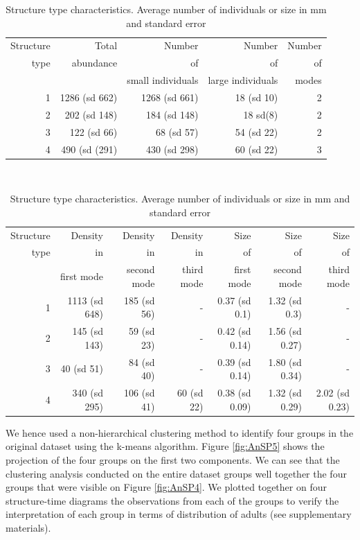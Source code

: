 \begin{table}[!ht]
\centering
\footnotesize
\caption{Structure type characteristics. Average number of
individuals or size in mm and standard error}\label{tab:4types}
\begin{tabular}{rrrrr}
  \hline
Structure  & Total & Number & Number & Number\\
type & abundance & of & of & of \\
  &  & small individuals & large individuals & modes \\
  \hline
  1 & 1286 (sd 662)& 1268 (sd 661)& 18 (sd 10)& 2\\ 
  2 & 202 (sd 148)& 184 (sd 148)& 18 sd(8)& 2\\ 
  3 & 122 (sd 66)& 68 (sd 57)& 54 (sd 22)& 2\\ 
  4 & 490 (sd (291)& 430 (sd 298)& 60 (sd 22)& 3\\ 
   \hline
\end{tabular}
\\[12pt]
\begin{tabular}{rrrrrrr}
  \hline
Structure  & Density & Density
& Density & Size & Size & Size \\
type & in & in & in & of & of & of \\
  & first mode &
 second mode & third mode & first mode & second mode & third mode \\
  \hline
1 & 1113 (sd 648)& 185 (sd 56)& - & 0.37 (sd 0.1) & 1.32 (sd 0.3) & - \\ 
  2 & 145 (sd 143)& 59 (sd 23)& - & 0.42 (sd 0.14) & 1.56 (sd 0.27) & - \\ 
  3 & 40 (sd 51) & 84 (sd 40)& - & 0.39 (sd 0.14)& 1.80 (sd 0.34) & - \\ 
  4 & 340 (sd 295)& 106 (sd 41)& 60 (sd 22)& 0.38 (sd 0.09) & 1.32 (sd 0.29) & 2.02
  (sd 0.23)\\
   \hline
\end{tabular}

\end{table}

We hence used a non-hierarchical clustering method to identify four groups in
the original dataset using the k-means algorithm. Figure \ref{fig:AnSP5} shows the projection
of the four groups on the first two components. We can see that the clustering
analysis conducted on the entire dataset groups well together the four groups
that were visible on Figure \ref{fig:AnSP4}. We plotted together on four structure-time
diagrams the observations from each of the groups to verify the interpretation
of each group in terms of distribution of adults (see supplementary materials).

